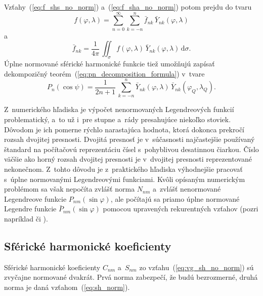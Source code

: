 \documentclass[a4paper, 12pt]{book}
\newcommand{\diff}{\mathrm d}
\begin{document}
Vzťahy~(\ref{eq:f_shs_no_norm}) a~(\ref{eq:f_sha_no_norm}) potom prejdu do
tvaru
%
\begin{equation}
\label{eq:f_shs}
f(\varphi, \lambda) = \sum_{n = 0}^\infty \sum_{k = -n}^n \bar{f}_{nk} \,
\bar{Y}_{nk}(\varphi, \lambda)
\end{equation}
%
a
%
\begin{equation}
\label{eq:f_sha}
\bar{f}_{nk} = \frac{1}{4\pi} \, \iint_{\sigma} f(\varphi, \lambda) \,
\bar{Y}_{nk}(\varphi, \lambda) \, \diff \sigma{.}
\end{equation}
%
Úplne normované sférické harmonické funkcie tiež umožňujú zapísať dekompozičný
teorém~(\ref{eq:pn_decomposition_formula}) v~tvare
\citep{MoritzPhysicalGeodesy}
%
\begin{equation}
P_n(\cos\psi) = \frac{1}{2n + 1} \, \sum_{k = -n}^n \bar{Y}_{nk}(\varphi,
\lambda) \, \bar{Y}_{nk}(\varphi_Q, \lambda_Q){.}
\end{equation}

Z~numerického hľadiska je výpočet nenormovaných Legendreových funkcií
problematický, a~to už i~pre stupne a~rády presahujúce niekoľko stoviek.
Dôvodom je ich pomerne rýchlo narastajúca hodnota, ktorá dokonca prekročí
rozsah dvojitej presnosti.  Dvojitá presnosť je v~súčasnosti najčastejšie
používaný štandard na počítačovú reprezentáciu čísel s~pohyblivou desatinnou
čiarkou.  Číslo väčšie ako horný rozsah dvojitej presnosti je v~dvojitej
presnosti reprezentované nekonečnom.  Z~tohto dôvodu je z~praktického hľadiska
výhodnejšie pracovať s~úplne normovanými Legendreovými funkciami.  Kvôli
opísaným numerickým problémom sa však nepočíta zvlášť norma $N_{nm}$ a~zvlášť
nenormované Legendreove funkcie $P_{nm}(\sin\varphi)$, ale počítajú sa priamo
úplne normované Legendre funkcie $\bar{P}_{nm}(\sin\varphi)$ pomocou upravených
rekurentných vzťahov (pozri napríklad \citealt{Holmes2002a} či
\citealt{Fukushima2012a}).



\subsection{Sférické harmonické koeficienty}

Sférické harmonické koeficienty $C_{nm}$ a~$S_{nm}$ zo
vzťahu~(\ref{eq:vg_sh_no_norm}) sú zvyčajne normované dvakrát.  Prvá norma
zabezpečí, že budú bezrozmerné, druhá norma je daná vzťahom~(\ref{eq:sh_norm}).
\end{document}
